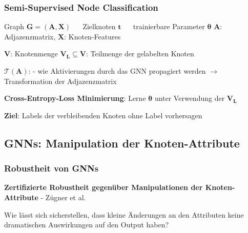\documentclass{beamer}
\begin{document}
\begin{frame}
  \frametitle{Semi-Supervised Node Classification}

  Graph $\boldsymbol{G} = (\boldsymbol{A}, \boldsymbol{X})$ $\quad$ Zielknoten $\boldsymbol{t}$ $\quad$ trainierbare Parameter $\boldsymbol{\theta}$\newline
  $\boldsymbol{A}$: Adjazenzmatrix, $\boldsymbol{X}$: Knoten-Features\newline

  $\boldsymbol{V}$: Knotenmenge\newline
  $\boldsymbol{V_L} \subseteq \boldsymbol{V}$: Teilmenge der gelabelten Knoten\newline

  $\boldsymbol{\mathcal{T}(A)}$:  - wie Aktivierungen durch das GNN propagiert werden
  $\rightarrow$ Transformation der Adjazenzmatrix\newline

  \textbf{Cross-Entropy-Loss Minimierung}:\newline
  Lerne $\boldsymbol{\theta}$ unter Verwendung der $\boldsymbol{V_L}$\newline

  \textbf{Ziel}: Labels der verbleibenden Knoten ohne Label vorhersagen

\end{frame}

\subsection{GNNs: Manipulation der Knoten-Attribute}

\begin{frame}
  \frametitle{Robustheit von GNNs}
  \textbf{Zertifizierte Robustheit gegenüber Manipulationen der Knoten-Attribute} - Zügner et al. \cite{Zuegner_2019}\newline

  Wie lässt sich sicherstellen, dass kleine Änderungen an den Attributen keine dramatischen Auswirkungen auf den Output haben?
\end{frame}
\end{document}
